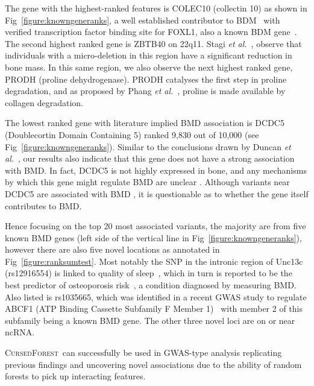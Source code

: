 \documentclass[10pt,letterpaper]{article}
\newcommand{\cursedforest}{\textsc{CursedForest}\xspace}
\begin{document}
The gene with the highest-ranked features is COLEC10 (collectin 10) as shown in Fig~\ref{figure:knowngeneranks}, a
well established contributor to BDM~\cite{Kemp2014,Liu2008} with verified transcription factor binding site for FOXL1,
also a known BDM gene~\cite{DECODE}.  The second highest ranked gene is ZBTB40 on 22q11. Stagi {\it et
  al.}~\cite{Stagi.2010}, observe that individuals with a micro-deletion in this region have a significant reduction in
bone mass. In this same region, we also observe the next highest ranked gene, PRODH (proline dehydrogenase).  PRODH
catalyses the first step in proline degradation, and as proposed by Phang {\it et al.}~\cite{Phang.2008}, proline is
made available by collagen degradation.

The lowest ranked gene with literature implied BMD association is DCDC5 (Doublecortin Domain Containing 5) ranked 9,830
out of 10,000 (see Fig~\ref{figure:knowngeneranks}).  Similar to the conclusions drawn by Duncan {\it et
  al.}~\cite{Duncan.2011}, our results also indicate that this gene does not have a strong association with BMD.  In
fact, DCDC5 is not highly expressed in bone, and any mechanisms by which this gene might regulate BMD are unclear
\cite{Thakker2012}.  Although variants near DCDC5 are associated with BMD \cite{Rivadeneira2009}, it is questionable as
to whether the gene itself contributes to BMD.

Hence focusing on the top 20 most associated variants, the majority are from five known BMD genes (left side of the
vertical line in Fig~\ref{figure:knowngeneranks}), however there are also five novel locations as annotated in
Fig~\ref{figure:ranksumtest}. Most notably the SNP in the intronic region of Unc13c (rs12916554) is linked to quality
of sleep~\cite{Nicod2016}, which in turn is reported to be the best predictor of osteoporosis risk~\cite{Magali2016}, a
condition diagnosed by measuring BMD.  Also listed is rs1035665, which was identified in a recent GWAS study to regulate
ABCF1 (ATP Binding Cassette Subfamily F Member 1)~\cite{Dixon2007} with member 2 of this subfamily being a known BMD
gene. The other three novel loci are on or near ncRNA.

\cursedforest\ can successfully be used in GWAS-type analysis replicating previous findings and uncovering novel associations due to the ability of random forests to pick up interacting features.  

\end{document}
